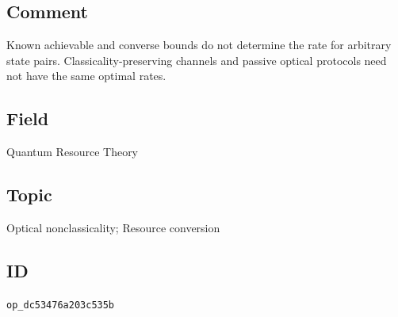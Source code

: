 \subsection*{Comment}

Known achievable and converse bounds do not determine the rate for arbitrary state pairs. Classicality-preserving channels and passive optical protocols need not have the same optimal rates.

\subsection*{Field}

Quantum Resource Theory

\subsection*{Topic}

Optical nonclassicality; Resource conversion

\subsection*{ID}

\texttt{op\_dc53476a203c535b}
